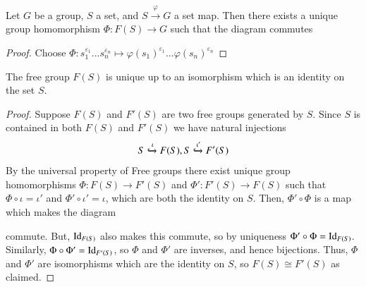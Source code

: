 \documentclass[12pt, a4paper, oneside, openright, titlepage]{book}
\begin{document}
\begin{namthm}
        Let $G$ be a group, $S$ a set, and $S\xrightarrow{\varphi}G$ a set map. Then there exists a unique group homomorphism $\Phi:F(S)\rightarrow G$ such that the diagram commutes 
        \begin{center}
        \end{center}
\end{namthm}
\begin{proof}
        Choose $\Phi:s_1^{\varepsilon_1}...s_n^{\varepsilon_n}\mapsto \varphi(s_1)^{\varepsilon_1}...\varphi(s_n)^{\varepsilon_n}$
\end{proof}


\begin{cor}
        The free group $F(S)$ is unique up to an isomorphism which is an identity on the set $S$.
\end{cor}
\begin{proof}
        Suppose $F(S)$ and $F'(S)$ are two free groups generated by $S$. Since $S$ is contained in both $F(S)$ and $F'(S)$ we have natural injections \begin{equation}
                S\xhookrightarrow{\iota}F(S),S\xhookrightarrow{\iota'}F'(S)
        \end{equation}
        By the universal property of Free groups there exist unique group homomorphisms $\Phi:F(S)\rightarrow F'(S)$ and $\Phi':F'(S)\rightarrow F(S)$ such that $\Phi \circ \iota = \iota'$ and $\Phi'\circ \iota' = \iota$, which are both the identity on $S$. Then, $\Phi'\circ \Phi$ is a map which makes the diagram \begin{center}
        \end{center}
        commute. But, $\operatorname{Id}_{F(S)}$ also makes this commute, so by uniqueness $\Phi'\circ \Phi = \operatorname{Id}_{F(S)}$. Similarly, $\Phi\circ \Phi' = \operatorname{Id}_{F'(S)}$, so $\Phi$ and $\Phi'$ are inverses, and hence bijections. Thus, $\Phi$ and $\Phi'$ are isomorphisms which are the identity on $S$, so $F(S)\cong F'(S)$ as claimed.
\end{proof}
\end{document}

